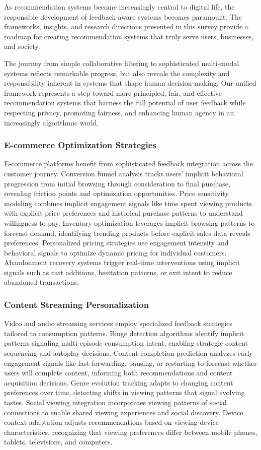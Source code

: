 As recommendation systems become increasingly central to digital life, the responsible development of feedback-aware systems becomes paramount. The frameworks, insights, and research directions presented in this survey provide a roadmap for creating recommendation systems that truly serve users, businesses, and society.

The journey from simple collaborative filtering to sophisticated multi-modal systems reflects remarkable progress, but also reveals the complexity and responsibility inherent in systems that shape human decision-making. Our unified framework represents a step toward more principled, fair, and effective recommendation systems that harness the full potential of user feedback while respecting privacy, promoting fairness, and enhancing human agency in an increasingly algorithmic world.

\subsubsection{E-commerce Optimization Strategies}

E-commerce platforms benefit from sophisticated feedback integration across the customer journey. Conversion funnel analysis tracks users' implicit behavioral progression from initial browsing through consideration to final purchase, revealing friction points and optimization opportunities. Price sensitivity modeling combines implicit engagement signals like time spent viewing products with explicit price preferences and historical purchase patterns to understand willingness-to-pay. Inventory optimization leverages implicit browsing patterns to forecast demand, identifying trending products before explicit sales data reveals preferences. Personalized pricing strategies use engagement intensity and behavioral signals to optimize dynamic pricing for individual customers. Abandonment recovery systems trigger real-time interventions using implicit signals such as cart additions, hesitation patterns, or exit intent to reduce abandoned transactions.

\subsubsection{Content Streaming Personalization}

Video and audio streaming services employ specialized feedback strategies tailored to consumption patterns. Binge detection algorithms identify implicit patterns signaling multi-episode consumption intent, enabling strategic content sequencing and autoplay decisions. Content completion prediction analyzes early engagement signals like fast-forwarding, pausing, or restarting to forecast whether users will complete content, informing both recommendations and content acquisition decisions. Genre evolution tracking adapts to changing content preferences over time, detecting shifts in viewing patterns that signal evolving tastes. Social viewing integration incorporates viewing patterns of social connections to enable shared viewing experiences and social discovery. Device context adaptation adjusts recommendations based on viewing device characteristics, recognizing that viewing preferences differ between mobile phones, tablets, televisions, and computers.

